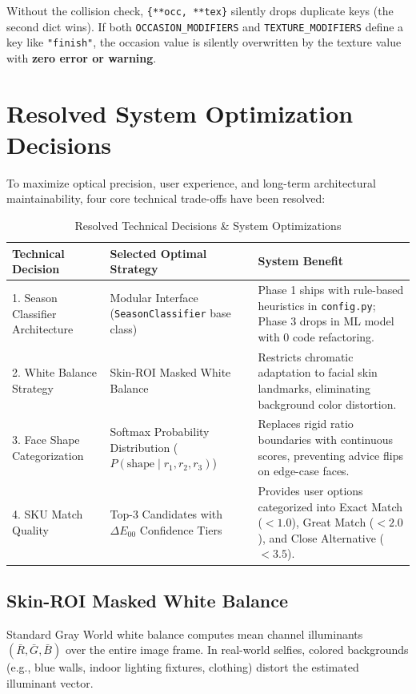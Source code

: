 \documentclass[12pt,a4paper]{article}
\begin{document}
\begin{dangerblock}
Without the collision check, \texttt{\{**occ, **tex\}} silently drops duplicate keys (the second dict wins). If both \texttt{OCCASION\_MODIFIERS} and \texttt{TEXTURE\_MODIFIERS} define a key like \texttt{"finish"}, the occasion value is silently overwritten by the texture value with \textbf{zero error or warning}.
\end{dangerblock}


\section{Resolved System Optimization Decisions}
\label{sec:resolved_decisions}

To maximize optical precision, user experience, and long-term architectural maintainability, four core technical trade-offs have been resolved:

\begin{table}[H]
\centering
\caption{Resolved Technical Decisions \& System Optimizations}
\begin{tabular}{@{}p{4.5cm} p{5.5cm} p{4.5cm}@{}}
\toprule
\textbf{Technical Decision} & \textbf{Selected Optimal Strategy} & \textbf{System Benefit} \\
\midrule
1. Season Classifier Architecture & Modular Interface (\texttt{SeasonClassifier} base class) & Phase 1 ships with rule-based heuristics in \texttt{config.py}; Phase 3 drops in ML model with 0 code refactoring. \\
2. White Balance Strategy & Skin-ROI Masked White Balance & Restricts chromatic adaptation to facial skin landmarks, eliminating background color distortion. \\
3. Face Shape Categorization & Softmax Probability Distribution ($P(\text{shape} \mid r_1, r_2, r_3)$) & Replaces rigid ratio boundaries with continuous scores, preventing advice flips on edge-case faces. \\
4. SKU Match Quality & Top-3 Candidates with $\Delta E_{00}$ Confidence Tiers & Provides user options categorized into Exact Match ($<1.0$), Great Match ($<2.0$), and Close Alternative ($<3.5$). \\
\bottomrule
\end{tabular}
\end{table}

\subsection{Skin-ROI Masked White Balance}
Standard Gray World white balance computes mean channel illuminants $(\bar{R}, \bar{G}, \bar{B})$ over the entire image frame. In real-world selfies, colored backgrounds (e.g., blue walls, indoor lighting fixtures, clothing) distort the estimated illuminant vector.
\end{document}
